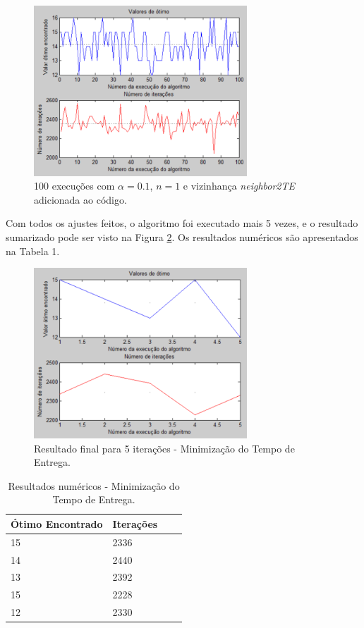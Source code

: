 \documentclass[conference]{IEEEtran}
\begin{document}
	\begin{figure}[h]
		\centering
		\includegraphics[width=8cm]{img/mult-result-6.png}
		\caption{100 execuções com $\alpha = 0.1$, $n = 1$ e vizinhança \textit{neighbor2TE} adicionada ao código.}
		\label{fig:mult-result-6}
	\end{figure}
	
Com todos os ajustes feitos, o algoritmo foi executado mais 5 vezes, e o resultado sumarizado pode ser visto na Figura \ref{fig:mult-result-7}. Os resultados numéricos são apresentados na Tabela 1.

	\begin{figure}[h]
		\centering
		\includegraphics[width=8cm]{img/mult-result-7.png}
		\caption{Resultado final para 5 iterações - Minimização do Tempo de Entrega.}
		\label{fig:mult-result-7}
	\end{figure}
	
	\begin{table}[h]
		\centering
		\begin{tabular}{ | l | l | l | l |}
			\hline
			Ótimo Encontrado & Iterações \\ \hline
			15 & 2336 \\ \hline
			14 & 2440 \\ \hline
			13 & 2392 \\ \hline
			15 & 2228 \\ \hline
			12 & 2330 \\ \hline
		\end{tabular}
		\label{table:result}
		\caption{Resultados numéricos - Minimização do Tempo de Entrega.}
	\end{table}
	
\end{document}
